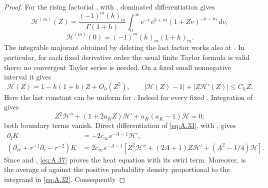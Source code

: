 \begin{proof}
For the rising factorial
, with
, dominated differentiation gives
\begin{equation}
 \mathcal H^{(m)}(Z)=\frac{(-1)^m(h)_m}{\Gamma(1+h)}
 \int_0^\infty e^{-v}v^{h+m}(1+Zv)^{-h-m}\,dv,
 \tag{A.34}\label{eq:A.34}
\end{equation}
\begin{equation}
 \mathcal H^{(m)}(0)=(-1)^m(h)_m(1+h)_m.
 \tag{A.35}\label{eq:A.35}
\end{equation}
The integrable majorant obtained by deleting the last factor works also at
. In particular, for each fixed derivative order the usual finite
Taylor formula is valid there; no convergent Taylor series is needed. On a fixed small
nonnegative interval it gives
\begin{equation}
 \mathcal H(Z)=1-h(1+h)Z+O_h(Z^2),\qquad
 |\mathcal H(Z)-1|+|Z\mathcal H'(Z)|\leq C_hZ.
 \tag{A.36}\label{eq:A.36}
\end{equation}
Here the last constant can be uniform for . Indeed
 for every fixed
. Integration of
 gives
\begin{equation}
 Z^2\mathcal H''+(1+2a_KZ)\mathcal H'+a_K(a_K-1)\mathcal H=0;
 \tag{A.37}\label{eq:A.37}
\end{equation}
both boundary terms vanish. Direct differentiation of \eqref{eq:A.33}, with
, gives
\[
\begin{aligned}
 \partial_tK&=-2c_\infty s^{-A-1}\mathcal H',\\
 (\partial_{rr}+r^{-1}\partial_r-r^{-2})K
 &=2c_\infty s^{-A-1}
   [Z^2\mathcal H''+(2A+1)Z\mathcal H'+(A^2-1/4)\mathcal H].
\end{aligned}
\]
Since  and
, \eqref{eq:A.37} proves the heat equation with its
swirl term. Moreover,  is the average of
 against the positive probability density proportional to the
integrand in \eqref{eq:A.32}. Consequently

\end{proof}
